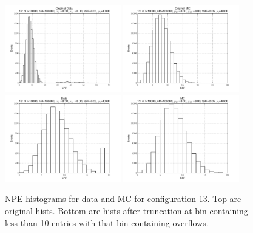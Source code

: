  \begin{figure}[htbp] \begin{center} 
\includegraphics[width=0.45\textwidth]{../FIGURES/13/FIG_Original_Data.pdf} 
\includegraphics[width=0.45\textwidth]{../FIGURES/13/FIG_Original_MC.pdf} 
\includegraphics[width=0.45\textwidth]{../FIGURES/13/FIG_Data.pdf} 
\includegraphics[width=0.45\textwidth]{../FIGURES/13/FIG_MC.pdf} 
\caption{NPE histograms for data and MC for configuration 13. Top are original hists. Bottom are hists after truncation at bin containing less than 10 entries with that bin containing overflows.} 
\label{tab:npe_13} 
\end{center} \end{figure} 

 
